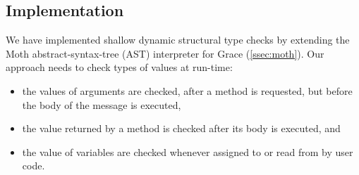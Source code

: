 
\subsection{Implementation} 
\label{ssec:implementation} 


We have implemented shallow dynamic structural type checks 
by extending the Moth abstract-syntax-tree (AST) interpreter for
Grace (\cref{ssec:moth}).
%
%
%
%
Our approach needs to check types of values at run-time:

\begin{itemize}
\item the values of arguments are checked, after a method is requested, 
      but before the body of the message is executed,
\item the value returned by a method is checked after its body is executed, and
\item the value of variables are checked
      whenever assigned to or read from by user code.
\end{itemize}

